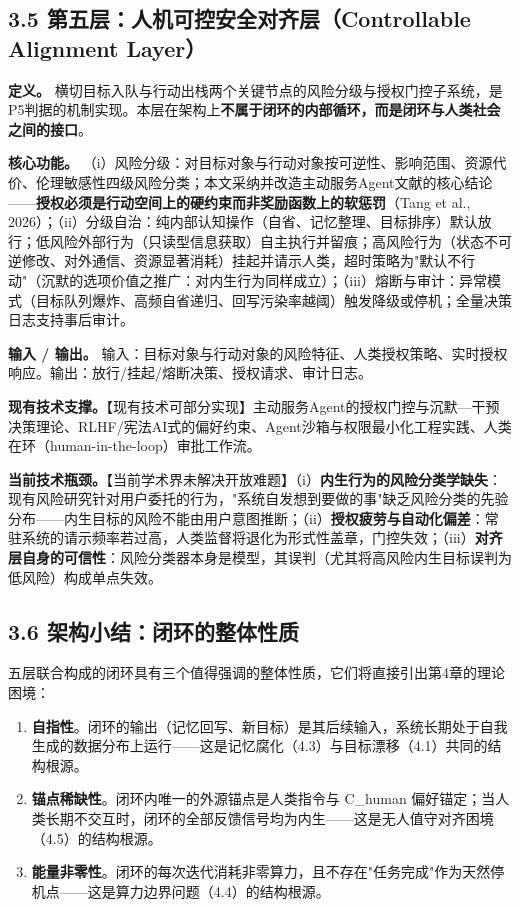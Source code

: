 \documentclass[11pt,a4paper]{ctexart}
\begin{document}
\subsection{3.5 第五层：人机可控安全对齐层（Controllable Alignment Layer）}

\textbf{定义。} 横切目标入队与行动出栈两个关键节点的风险分级与授权门控子系统，是P5判据的机制实现。本层在架构上\textbf{不属于闭环的内部循环，而是闭环与人类社会之间的接口}。

\textbf{核心功能。} （i）风险分级：对目标对象与行动对象按可逆性、影响范围、资源代价、伦理敏感性四级风险分类；本文采纳并改造主动服务Agent文献的核心结论——\textbf{授权必须是行动空间上的硬约束而非奖励函数上的软惩罚}（Tang et al., 2026）；（ii）分级自治：纯内部认知操作（自省、记忆整理、目标排序）默认放行；低风险外部行为（只读型信息获取）自主执行并留痕；高风险行为（状态不可逆修改、对外通信、资源显著消耗）挂起并请示人类，超时策略为"默认不行动"（沉默的选项价值之推广：对内生行为同样成立）；（iii）熔断与审计：异常模式（目标队列爆炸、高频自省递归、回写污染率越阈）触发降级或停机；全量决策日志支持事后审计。

\textbf{输入 / 输出。} 输入：目标对象与行动对象的风险特征、人类授权策略、实时授权响应。输出：放行/挂起/熔断决策、授权请求、审计日志。

\textbf{现有技术支撑。}【现有技术可部分实现】主动服务Agent的授权门控与沉默—干预决策理论、RLHF/宪法AI式的偏好约束、Agent沙箱与权限最小化工程实践、人类在环（human-in-the-loop）审批工作流。

\textbf{当前技术瓶颈。}【当前学术界未解决开放难题】（i）\textbf{内生行为的风险分类学缺失}：现有风险研究针对用户委托的行为，"系统自发想到要做的事"缺乏风险分类的先验分布——内生目标的风险不能由用户意图推断；（ii）\textbf{授权疲劳与自动化偏差}：常驻系统的请示频率若过高，人类监督将退化为形式性盖章，门控失效；（iii）\textbf{对齐层自身的可信性}：风险分类器本身是模型，其误判（尤其将高风险内生目标误判为低风险）构成单点失效。

\subsection{3.6 架构小结：闭环的整体性质}

五层联合构成的闭环具有三个值得强调的整体性质，它们将直接引出第4章的理论困境：

\begin{enumerate}

  \item \textbf{自指性}。闭环的输出（记忆回写、新目标）是其后续输入，系统长期处于自我生成的数据分布上运行——这是记忆腐化（4.3）与目标漂移（4.1）共同的结构根源。

  \item \textbf{锚点稀缺性}。闭环内唯一的外源锚点是人类指令与 C\_human 偏好锚定；当人类长期不交互时，闭环的全部反馈信号均为内生——这是无人值守对齐困境（4.5）的结构根源。

  \item \textbf{能量非零性}。闭环的每次迭代消耗非零算力，且不存在"任务完成"作为天然停机点——这是算力边界问题（4.4）的结构根源。

\end{enumerate}
\end{document}
